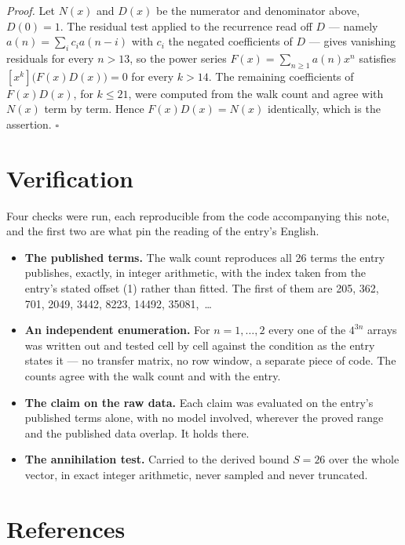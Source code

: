 \documentclass[11pt]{article}
\theoremstyle{definition}
\begin{document}
{\itshape Proof.} Let $N(x)$ and $D(x)$ be the numerator and denominator above, $D(0)=1$. The residual test applied to the recurrence read off $D$ --- namely $a(n) = \sum_i c_i a(n-i)$ with $c_i$ the negated coefficients of $D$ --- gives vanishing residuals for every $n > 13$, so the power series $F(x)=\sum_{n\ge 1}a(n)x^n$ satisfies $[x^k]\bigl(F(x)D(x)\bigr) = 0$ for every $k > 14$. The remaining coefficients of $F(x)D(x)$, for $k \le 21$, were computed from the walk count and agree with $N(x)$ term by term. Hence $F(x)D(x) = N(x)$ identically, which is the assertion. $\square$

\section{Verification}

Four checks were run, each reproducible from the code accompanying this note, and the first two are what pin the reading of the entry's English.

\begin{itemize}

\item {\bfseries The published terms.} The walk count reproduces all 26 terms the entry publishes, exactly, in integer arithmetic, with the index taken from the entry's stated offset (1) rather than fitted. The first of them are 205, 362, 701, 2049, 3442, 8223, 14492, 35081,~\dots

\item {\bfseries An independent enumeration.} For $n = 1,\dots,2$ every one of the $4^{3n}$ arrays was written out and tested cell by cell against the condition as the entry states it --- no transfer matrix, no row window, a separate piece of code. The counts agree with the walk count and with the entry.

\item {\bfseries The claim on the raw data.} Each claim was evaluated on the entry's published terms alone, with no model involved, wherever the proved range and the published data overlap. It holds there.

\item {\bfseries The annihilation test.} Carried to the derived bound $S = 26$ over the whole vector, in exact integer arithmetic, never sampled and never truncated.

\end{itemize}

\section{References}
\end{document}
